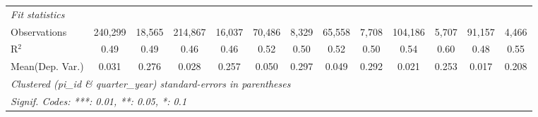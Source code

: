 \begin{tabular}{lcccccccccccc}
   \midrule
   \emph{Fit statistics}\\
   Observations                                               & 240,299        & 18,565         & 214,867       & 16,037         & 70,486        & 8,329         & 65,558        & 7,708          & 104,186       & 5,707       & 91,157        & 4,466\\  
   R$^2$                                                      & 0.49           & 0.49           & 0.46          & 0.46           & 0.52          & 0.50          & 0.52          & 0.50           & 0.54          & 0.60        & 0.48          & 0.55\\  
Mean(Dep. Var.) & 0.031 & 0.276 & 0.028 & 0.257 & 0.050 & 0.297 & 0.049 & 0.292 & 0.021 & 0.253 & 0.017 & 0.208 \\
   \midrule \midrule
   \multicolumn{13}{l}{\emph{Clustered (pi\_id \& quarter\_year) standard-errors in parentheses}}\\
   \multicolumn{13}{l}{\emph{Signif. Codes: ***: 0.01, **: 0.05, *: 0.1}}\\
\end{tabular}
\par\endgroup
